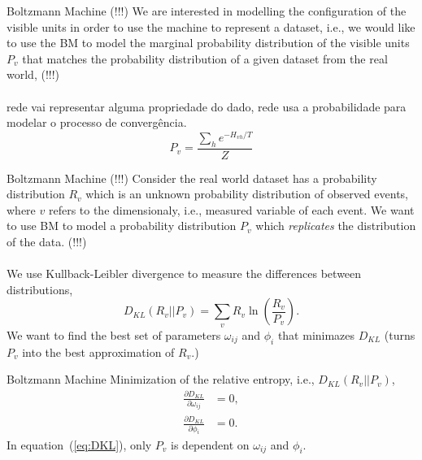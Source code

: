\begin{frame}{Boltzmann Machine}
    \justifying%
    (!!!) We are interested in modelling the configuration of the visible units in order to use the machine to represent a dataset, i.e., we would like to use the BM to model the marginal probability distribution of the visible units $P_{v}$ that matches the probability distribution of a given dataset from the real world, (!!!)
    \\~\\
    rede vai representar alguma propriedade do dado, rede usa a probabilidade para modelar o processo de convergência.
    \begin{equation}
        \label{eq:marginal-prob-bm}
        P_{v} = \frac{\sum_{h} e^{-H_{vh}/T}}{Z}
    \end{equation}
\end{frame}


\begin{frame}{Boltzmann Machine}
    \justifying%
    (!!!) Consider the real world dataset has a probability distribution $R_{v}$ which is an unknown probability distribution of observed events, where $v$ refers to the dimensionaly, i.e., measured variable of each event. We want to use BM to model a probability distribution $P_{v}$ which \textit{replicates} the distribution of the data. (!!!)
    \\~\\
    We use Kullback-Leibler divergence to measure the differences between distributions,
    \begin{equation}
        \label{eq:DKL}
        D_{KL}(R_{v}||P_{v}) = \sum_{v} R_{v} \ln\left(\frac{R_{v}}{P_{v}}\right).
    \end{equation}
    We want to find the best set of parameters $\omega_{ij}$ and $\phi_{i}$ that minimazes $D_{KL}$ (turns $P_{v}$ into the best approximation of $R_{v}$.)
\end{frame}


\begin{frame}{Boltzmann Machine}
    \justifying%
    Minimization of the relative entropy, i.e., $D_{KL}(R_{v}||P_{v})$,
    \begin{align}
        \label{eq:DKL-omega}
        \frac{\partial D_{KL}}{\partial \omega_{ij}} &= 0, \\
        \label{eq:DKL-phi}
        \frac{\partial D_{KL}}{\partial \phi_{i}} &= 0.
    \end{align}
    In equation~(\ref{eq:DKL}), only $P_{v}$ is dependent on $\omega_{ij}$ and $\phi_{i}$.
\end{frame}


